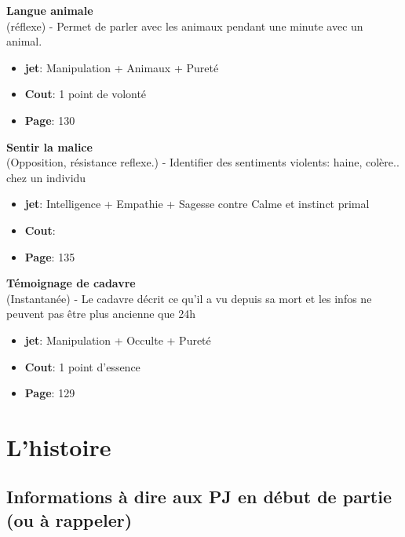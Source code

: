\documentclass[oneside,12pt]{book}
\newcommand\don[6]{
\textbf{#1} \\
(#6) - #2
\begin{itemize}
\item{ \textbf{jet}: #3}
\item{ \textbf{Cout}: #4}
\item{ \textbf{Page}: #5}
\end{itemize}
\vspace{0.5cm}
}
\begin{document}
\begin{flushleft}
\don{Langue animale}{Permet de parler avec les animaux pendant une minute avec un animal.}{Manipulation + Animaux + Pureté}{1 point de volonté}{130}{réflexe}
\don{Sentir la malice}{Identifier des sentiments violents: haine, colère.. chez un individu}{Intelligence + Empathie + Sagesse contre Calme et instinct primal}{}{135}{Opposition, résistance reflexe.}
\don{Témoignage de cadavre}{Le cadavre décrit ce qu'il a vu depuis sa mort et les infos ne peuvent pas être plus ancienne que 24h}{Manipulation + Occulte + Pureté}{1 point d'essence}{129}{Instantanée}

\chapter{L'histoire}
\section{Informations à dire aux PJ en début de partie  (ou à rappeler) }

\clearpage



\end{flushleft}
\end{document}
